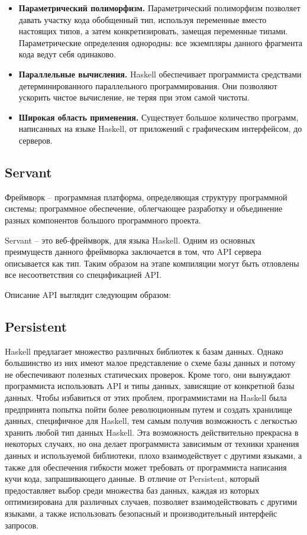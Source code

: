 \begin{itemize}
	\item \textbf{Параметрический полиморфизм.} Параметрический полиморфизм позволяет давать участку кода обобщенный тип, используя переменные вместо настоящих типов, а затем конкретизировать, замещая переменные типами. Параметрические определения однородны: все экземпляры данного фрагмента кода ведут себя одинаково.
	
	\item \textbf{Параллельные вычисления.} Haskell обеспечивает программиста средствами детерминированного параллельного программирования. Они позволяют ускорить чистое вычисление, не теряя при этом самой чистоты.
	
	\item \textbf{Широкая область применения.} Существует большое количество программ, написанных на языке Haskell, от приложений с графическим интерфейсом, до серверов.
	
	 
\end{itemize}

\subsection{Servant}
Фреймворк -- программная платформа, определяющая структуру программной системы; программное обеспечение, облегчающее разработку и объединение разных компонентов большого программного проекта.

Servant -- это веб-фреймворк, для языка Haskell. Одним из основных преимуществ данного фреймворка заключается в том, что API сервера описывается как тип. Таким образом на этапе компиляции могут быть отловлены все несоответствия со спецификацией API.

Описание API выглядит следующим образом: 


\subsection{Persistent}
Haskell предлагает множество различных библиотек к базам данных. Однако большинство из них имеют малое представление о схеме базы данных и потому не обеспечивают полезных статических проверок. Кроме того, они вынуждают программиста использовать API и типы данных, зависящие от конкретной базы данных. Чтобы избавиться от этих проблем, программистами на Haskell была предпринята попытка пойти более революционным путем и создать хранилище данных, специфичное для Haskell, тем самым получив возможность с легкостью хранить любой тип данных Haskell. Эта возможность действительно прекрасна в некоторых случаях, но она делает программиста зависимым от техники хранения данных и используемой библиотеки, плохо взаимодействует с другими языками, а также для обеспечения гибкости может требовать от программиста написания кучи кода, запрашивающего данные. В отличие от Persistent, который предоставляет выбор среди множества баз данных, каждая из которых оптимизирована для различных случаев, позволяет взаимодействовать с другими языками, а также использовать безопасный и производительный интерфейс запросов.

